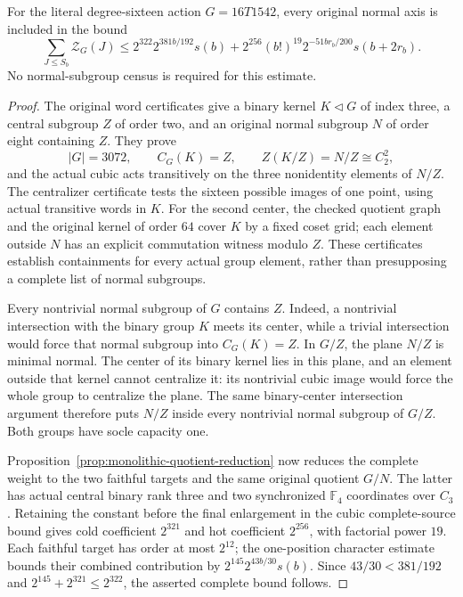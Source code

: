 \begin{samepage}
\begin{corollary}
\label{cor:literal-1542-source}
For the literal degree-sixteen action $G=16T1542$, every original normal
axis is included in the bound
\[
 \sum_{J\leq S_b}\mathcal Z_G(J)
 \leq 2^{322}2^{381b/192}s(b)
       +2^{256}(b!)^{19}2^{-51br_b/200}s(b+2r_b).
\]
No normal-subgroup census is required for this estimate.
\end{corollary}
\end{samepage}
\begin{proof}
The original word certificates give a binary kernel $K\lhd G$ of
index three, a central subgroup $Z$ of order two, and an original
normal subgroup $N$ of order eight containing $Z$. They prove
\[
 |G|=3072,\qquad C_G(K)=Z,\qquad
 Z(K/Z)=N/Z\cong C_2^2,
\]
and the actual cubic acts transitively on the three nonidentity
elements of $N/Z$. The centralizer certificate tests the sixteen
possible images of one point, using actual transitive words in $K$.
For the second center, the checked quotient graph and the original
kernel of order $64$ cover $K$ by a fixed coset grid; each element
outside $N$ has an explicit commutation witness modulo $Z$.
These certificates establish containments for every actual group
element, rather than presupposing a complete list of normal subgroups.

Every nontrivial normal subgroup of $G$ contains $Z$. Indeed, a
nontrivial intersection with the binary group $K$ meets its center,
while a trivial intersection would force that normal subgroup into
$C_G(K)=Z$. In $G/Z$, the plane $N/Z$ is minimal normal. The center
of its binary kernel lies in this plane, and an element outside that
kernel cannot centralize it: its nontrivial cubic image would force
the whole group to centralize the plane. The same binary-center
intersection argument therefore puts $N/Z$ inside every nontrivial
normal subgroup of $G/Z$. Both groups have socle capacity one.

Proposition~\ref{prop:monolithic-quotient-reduction} now reduces the
complete weight to the two faithful targets and the same original
quotient $G/N$. The latter has actual central binary rank three and
two synchronized $\mathbb F_4$ coordinates over $C_3$. Retaining
the constant before the final enlargement in the cubic complete-source
bound gives cold coefficient $2^{321}$ and hot coefficient $2^{256}$,
with factorial power $19$. Each faithful target has order at most
$2^{12}$; the one-position character estimate bounds their combined
contribution by $2^{145}2^{43b/30}s(b)$. Since
$43/30<381/192$ and $2^{145}+2^{321}\leq2^{322}$,
the asserted complete bound follows.
\end{proof}

